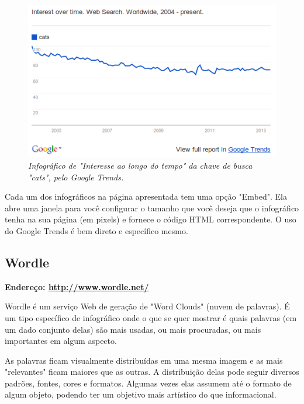 \documentclass[12pt,onecolumn]{article}
\begin{document}
    \begin{figure}[ht]
      \centering
      \includegraphics[width=.9\linewidth]{cats.png}
      \caption{
        \footnotesize
        \it
        Infográfico de "Interesse ao longo do tempo" da chave de busca "cats",
        pelo Google Trends.
      }
      \label{fig:cats}
    \end{figure}
    
    Cada um dos infográficos na página apresentada tem uma opção "Embed". Ela
    abre uma janela para você configurar o tamanho que você deseja que o
    infográfico tenha na sua página (em pixels) e fornece o código HTML
    correspondente. O uso do Google Trends é bem direto e específico mesmo.

  \subsection{Wordle}
    \textbf{Endereço: \url{http://www.wordle.net/}}
    
    Wordle é um serviço Web de geração de "Word Clouds" (nuvem de palavras). É
    um tipo específico de infográfico onde o que se quer mostrar é quais
    palavras (em um dado conjunto delas) são mais usadas, ou mais procuradas,
    ou mais importantes em algum aspecto.
    
    As palavras ficam visualmente distribuídas em uma mesma imagem e as mais
    "relevantes" ficam maiores que as outras. A distribuição delas pode seguir
    diversos padrões, fontes, cores e formatos. Algumas vezes elas assumem até o
    formato de algum objeto, podendo ter um objetivo mais artístico do que
    informacional.
    
\end{document}

